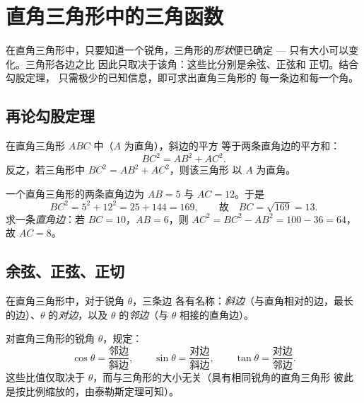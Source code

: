 \chapter{直角三角形中的三角函数}\label{ch:g9:trig}

在直角三角形中，只要知道一个锐角，三角形的\emph{形状}便已确定
 --- 只有大小可以变化。三角形各边之比
因此只取决于该角：这些比分别是余弦、正弦和
正切。结合勾股定理，
只需极少的已知信息，即可求出直角三角形的
每一条边和每一个角。

\section{再论勾股定理}

\begin{theorem}[毕达哥拉斯]\label{thm:g9:trig:pythagoras}
在直角三角形 $ABC$ 中（$A$ 为直角），斜边的平方
等于两条直角边的平方和：
\[
BC^2 = AB^2 + AC^2 .
\]
反之，若三角形中 $BC^2 = AB^2 + AC^2$，则该三角形
以 $A$ 为直角。
\end{theorem}
\admitted

\begin{example}\label{ex:g9:trig:pythagoras}
一个直角三角形的两条直角边为 $AB = 5$ 与 $AC = 12$。于是
\[
BC^2 = 5^2 + 12^2 = 25 + 144 = 169,
\qquad\text{故}\quad BC = \sqrt{169} = 13 .
\]
求一条\emph{直角边}：若 $BC = 10$，$AB = 6$，则
$AC^2 = BC^2 - AB^2 = 100 - 36 = 64$，故 $AC = 8$。
\end{example}

\section{余弦、正弦、正切}

在直角三角形中，对于锐角 $\theta$，三条边
各有名称：\emph{斜边}（与直角相对的边，最长
的边）、$\theta$ 的\emph{对边}，以及
$\theta$ 的\emph{邻边}（与 $\theta$ 相接的直角边）。

\begin{definition}[锐角三角函数]\label{def:g9:trig:ratios}
对直角三角形的锐角 $\theta$，规定：
\[
\cos\theta = \frac{\text{邻边}}{\text{斜边}},
\qquad
\sin\theta = \frac{\text{对边}}{\text{斜边}},
\qquad
\tan\theta = \frac{\text{对边}}{\text{邻边}} .
\]
这些比值仅取决于
$\theta$，而与三角形的大小无关（具有相同锐角的直角三角形
彼此是按比例缩放的，由泰勒斯定理可知）。
\end{definition}

